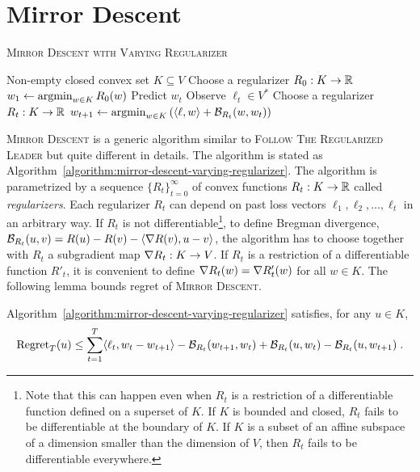 \section{Mirror Descent}
\label{section:mirror-descent}

\begin{algorithm}[t]
\caption{\textsc{Mirror Descent with Varying Regularizer}}
\label{algorithm:mirror-descent-varying-regularizer}
\begin{algorithmic}[1]
\REQUIRE Non-empty closed convex set $K \subseteq V$
\STATE Choose a regularizer $R_0:K \to \mathbb{R}$
\STATE $w_1 \leftarrow \operatorname*{argmin}_{w \in K} R_0(w)$
\STATE Predict $w_t$
\STATE Observe $\ell_t \in V^*$
\STATE Choose a regularizer $R_t:K \to \mathbb{R}$
\STATE $w_{t+1} \leftarrow \operatorname*{argmin}_{w \in K} \left( \langle \ell, w \rangle + \mathcal{B}_{R_t}(w, w_t) \right)$
\ENDFOR
\end{algorithmic}
\end{algorithm}


\textsc{Mirror Descent} is a generic algorithm similar to \textsc{Follow The
Regularized Leader} but quite different in details. The algorithm is stated as
Algorithm~\ref{algorithm:mirror-descent-varying-regularizer}. The algorithm is
parametrized by a sequence $\{R_t\}_{t=0}^\infty$ of convex functions $R_t:K
\to \mathbb{R}$ called \emph{regularizers}. Each regularizer $R_t$ can depend on past
loss vectors $\ell_1, \ell_2, \dots, \ell_t$ in an arbitrary way. If $R_t$ is
not differentiable\footnote{Note that this can happen even when $R_t$ is a
restriction of a differentiable function defined on a superset of $K$.  If $K$
is bounded and closed, $R_t$ fails to be differentiable at the boundary of $K$.
If $K$ is a subset of an affine subspace of a dimension smaller than the
dimension of $V$, then $R_t$ fails to be differentiable everywhere.}, to define
Bregman divergence, $\mathcal{B}_{R_t}(u,v) = R(u) - R(v) - \langle \nabla R(v), u - v
\rangle$, the algorithm has to choose together with $R_t$ a subgradient map
$\nabla R_t:K \to V$.  If $R_t$ is a restriction of a differentiable function
$R'_t$, it is convenient to define $\nabla R_t(w) = \nabla R'_t(w)$ for all $w
\in K$. The following lemma bounds regret of \textsc{Mirror Descent}.

\begin{lemma}
Algorithm~\ref{algorithm:mirror-descent-varying-regularizer} satisfies, for any
$u \in K$,
$$
\operatorname{Regret}_T(u)
\le
\sum_{t=1}^T \langle \ell_t, w_t - w_{t+1} \rangle - \mathcal{B}_{R_t}(w_{t+1}, w_t) + \mathcal{B}_{R_t}(u,w_t) - \mathcal{B}_{R_t}(u, w_{t+1}) \; .
$$
\end{lemma}

